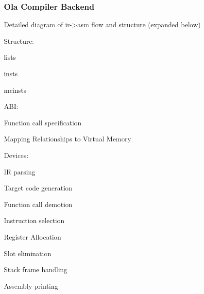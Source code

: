 \subsubsection{Ola Compiler Backend}

Detailed diagram of ir->asm flow and structure (expanded below)

Structure:

    lists

    insts

    mcinsts

ABI:

    Function call specification

    Mapping Relationships to Virtual Memory

Devices:

    IR parsing

    Target code generation

        Function call demotion

        Instruction selection

        Register Allocation

        Slot elimination

        Stack frame handling

        Assembly printing

